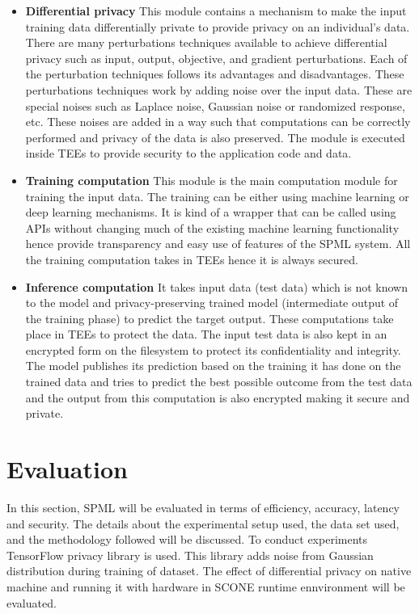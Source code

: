\begin{itemize}
    \item \textbf{Differential privacy}
This module contains a mechanism to make the input training data differentially private to provide privacy on an individual's data. There are many perturbations techniques available to achieve differential privacy such as input, output, objective, and gradient perturbations. Each of the perturbation techniques follows its advantages and disadvantages. These perturbations techniques work by adding noise over the input data. These are special noises such as Laplace noise, Gaussian noise or randomized response, etc. These noises are added in a way such that computations can be correctly performed and privacy of the data is also preserved. The module is executed inside TEEs to provide security to the application code and data.
    \vspace{-0.3cm}\item \textbf{Training computation}
This module is the main computation module for training the input data. The training can be either using machine learning or deep learning mechanisms. It is kind of a wrapper that can be called using APIs without changing much of the existing machine learning functionality hence provide transparency and easy use of features of the SPML system. All the training computation takes in TEEs hence it is always secured. 
    \vspace{-0.3cm}\item \textbf{Inference computation}
It takes input data (test data) which is not known to the model and privacy-preserving trained model (intermediate output of the training phase) to predict the target output. These computations take place in TEEs to protect the data. The input test data is also kept in an encrypted form on the filesystem to protect its confidentiality and integrity. The model publishes its prediction based on the training it has done on the trained data and tries to predict the best possible outcome from the test data and the output from this computation is also encrypted making it secure and private.
\end{itemize}


\chapter{Evaluation}
\label{sec:eval}
In this section, SPML will be evaluated in terms of efficiency, accuracy, latency and security. The details about the experimental setup used, the data set used, and the methodology followed will be discussed. To conduct experiments TensorFlow privacy library \cite{11} is used. This library adds noise from Gaussian distribution during training of dataset. The effect of differential privacy on native machine and running it with hardware in SCONE runtime ennvironment will be evaluated.


